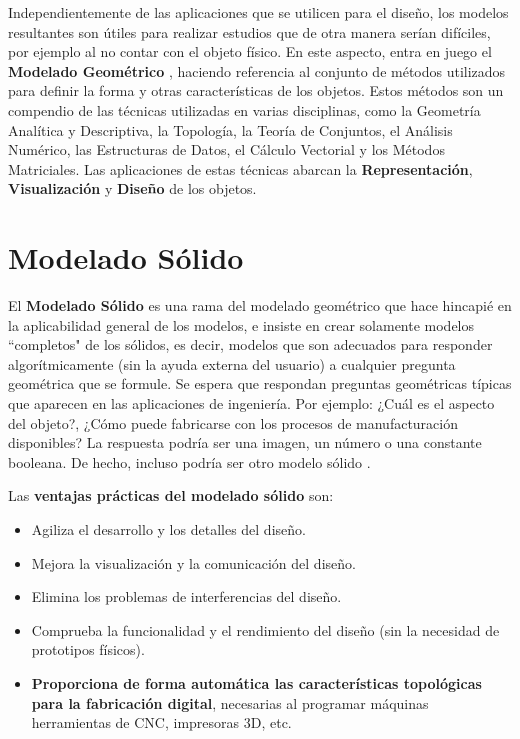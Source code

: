 Independientemente de las aplicaciones que se utilicen para el diseño, los modelos resultantes son útiles para realizar estudios que de otra manera serían difíciles, por ejemplo al no contar con el objeto físico. En este aspecto, entra en juego el \textbf{Modelado Geométrico}  \citep{Ramos2011}, haciendo referencia al conjunto de métodos utilizados para definir la forma y otras características de los objetos. Estos métodos son un compendio de las técnicas utilizadas en varias disciplinas, como la Geometría Analítica y Descriptiva, la Topología, la Teoría de Conjuntos, el Análisis Numérico, las Estructuras de Datos, el Cálculo Vectorial y los Métodos Matriciales. Las aplicaciones de estas técnicas abarcan la \textbf{Representación}, \textbf{Visualización} y \textbf{Diseño} de los objetos.




\section{Modelado Sólido}
\label{ref:modelado-solido}
 El \textbf{Modelado Sólido} \citep{Foley-ITC-1990} es una rama del modelado geométrico que  hace hincapié en la aplicabilidad general de los modelos, e insiste en crear solamente modelos ``completos" de los sólidos, es decir, modelos que son adecuados para responder algorítmicamente (sin la ayuda externa del usuario) a cualquier pregunta geométrica que se formule. Se espera que respondan preguntas geométricas típicas que aparecen en las aplicaciones de ingeniería. Por ejemplo:
¿Cuál es el aspecto del objeto?, ¿Cómo puede fabricarse con los procesos de manufacturación disponibles? 
La respuesta podría ser una imagen, un número o una constante booleana. De hecho, incluso podría ser otro modelo sólido \citep{Ramos2011}. 


\vspace{5mm}
Las \textbf{ventajas prácticas del modelado sólido} son:
\begin{itemize}
    \item Agiliza el desarrollo y los detalles del diseño.
    \item Mejora la visualización y la comunicación del diseño.
    \item Elimina los problemas de interferencias del diseño.
    \item Comprueba la funcionalidad y el rendimiento del diseño (sin la necesidad de prototipos físicos).
    \item \textbf{Proporciona de forma automática las características topológicas para la fabricación digital}, necesarias al programar máquinas herramientas de CNC, impresoras 3D, etc.
\end{itemize}


